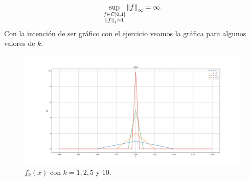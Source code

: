 \begin{homeworkProblem}
\begin{solution}
\begin{enumerate}[(i)]
\begin{align*}
        \sup_{\substack{f\in C[0,1]\\ \left\|f\right\|_{1}=1}}\left\|f\right\|_{\infty}=\infty.
      \end{align*}
      Con la intención de ser gráfico con el ejercicio veamos la gráfica para algunos valores de $k$.
      \begin{figure}[H]
      \begin{center}
        \includegraphics[scale=0.3]{Figures/graficacontraejemplo.png}
      \end{center}
        \caption{$f_k(x)$ con $k=1,2,5$ y $10$.}
      \end{figure} 
    \end{enumerate}
  \end{solution}
\end{homeworkProblem}
